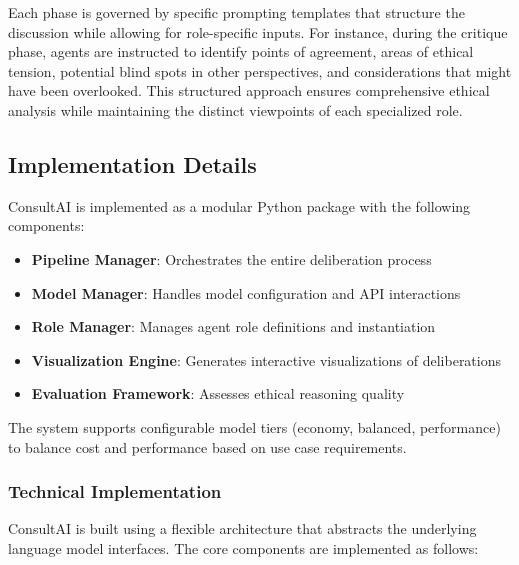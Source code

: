 \documentclass[11pt]{article}
\begin{document}
Each phase is governed by specific prompting templates that structure the discussion while allowing for role-specific inputs. For instance, during the critique phase, agents are instructed to identify points of agreement, areas of ethical tension, potential blind spots in other perspectives, and considerations that might have been overlooked. This structured approach ensures comprehensive ethical analysis while maintaining the distinct viewpoints of each specialized role.

\subsection{Implementation Details}

ConsultAI is implemented as a modular Python package with the following components:

\begin{itemize}
    \item \textbf{Pipeline Manager}: Orchestrates the entire deliberation process
    \item \textbf{Model Manager}: Handles model configuration and API interactions
    \item \textbf{Role Manager}: Manages agent role definitions and instantiation
    \item \textbf{Visualization Engine}: Generates interactive visualizations of deliberations
    \item \textbf{Evaluation Framework}: Assesses ethical reasoning quality
\end{itemize}

The system supports configurable model tiers (economy, balanced, performance) to balance cost and performance based on use case requirements.

\subsubsection{Technical Implementation}

ConsultAI is built using a flexible architecture that abstracts the underlying language model interfaces. The core components are implemented as follows:
\end{document}

